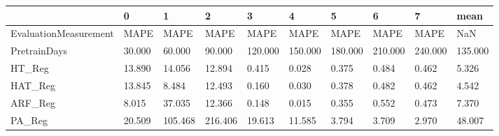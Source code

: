 \begin{tabular}{llllllllll}
\toprule
{} &      0 &       1 &       2 &       3 &       4 &       5 &       6 &       7 &    mean \\
\midrule
EvaluationMeasurement &   MAPE &    MAPE &    MAPE &    MAPE &    MAPE &    MAPE &    MAPE &    MAPE &     NaN \\
PretrainDays          & 30.000 &  60.000 &  90.000 & 120.000 & 150.000 & 180.000 & 210.000 & 240.000 & 135.000 \\
HT\_Reg                & 13.890 &  14.056 &  12.894 &   0.415 &   0.028 &   0.375 &   0.484 &   0.462 &   5.326 \\
HAT\_Reg               & 13.845 &   8.484 &  12.493 &   0.160 &   0.030 &   0.378 &   0.482 &   0.462 &   4.542 \\
ARF\_Reg               &  8.015 &  37.035 &  12.366 &   0.148 &   0.015 &   0.355 &   0.552 &   0.473 &   7.370 \\
PA\_Reg                & 20.509 & 105.468 & 216.406 &  19.613 &  11.585 &   3.794 &   3.709 &   2.970 &  48.007 \\
\bottomrule
\end{tabular}
